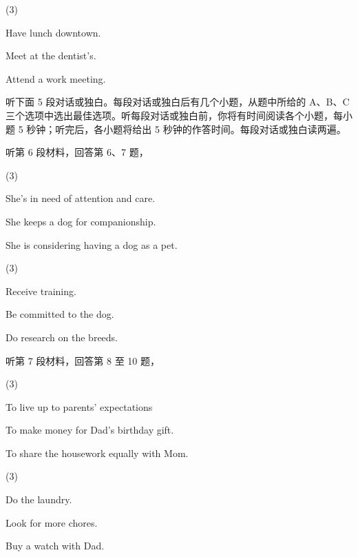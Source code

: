 \documentclass{英语试卷}
\begin{document}
\begin{choices}(3)
  \item Have lunch downtown.
  \item Meet at the dentist's.
  \item Attend a work meeting.
\end{choices}
\par 听下面 5 段对话或独白。每段对话或独白后有几个小题，从题中所给的 A、B、C 三个选项中选出最佳选项。听每段对话或独白前，你将有时间阅读各个小题，每小题 5 秒钟；听完后，各小题将给出 5 秒钟的作答时间。每段对话或独白读两遍。\par
\par 听第 6 段材料，回答第 6、7 题，\par
{}
\begin{choices}(3)
  \item She's in need of attention and care.
  \item She keeps a dog for companionship.
  \item She is considering having a dog as a pet.
\end{choices}
\begin{choices}(3)
  \item Receive training.
  \item Be committed to the dog.
  \item Do research on the breeds.
\end{choices}
\par 听第 7 段材料，回答第 8 至 10 题，\par
{}
\begin{choices}(3)
  \item To live up to parents' expectations
  \item To make money for Dad's birthday gift.
  \item To share the housework equally with Mom.
\end{choices}
\begin{choices}(3)
  \item Do the laundry.
  \item Look for more chores.
  \item Buy a watch with Dad.
\end{choices}
\end{document}
